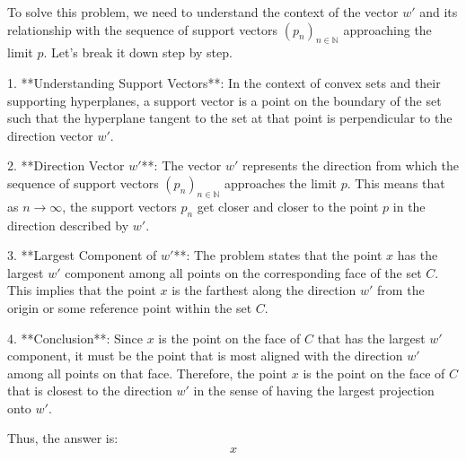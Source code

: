 To solve this problem, we need to understand the context of the vector \( w' \) and its relationship with the sequence of support vectors \( (p_n)_{n \in \mathbb{N}} \) approaching the limit \( p \). Let's break it down step by step.

1. **Understanding Support Vectors**: In the context of convex sets and their supporting hyperplanes, a support vector is a point on the boundary of the set such that the hyperplane tangent to the set at that point is perpendicular to the direction vector \( w' \).

2. **Direction Vector \( w' \)**: The vector \( w' \) represents the direction from which the sequence of support vectors \( (p_n)_{n \in \mathbb{N}} \) approaches the limit \( p \). This means that as \( n \to \infty \), the support vectors \( p_n \) get closer and closer to the point \( p \) in the direction described by \( w' \).

3. **Largest Component of \( w' \)**: The problem states that the point \( x \) has the largest \( w' \) component among all points on the corresponding face of the set \( C \). This implies that the point \( x \) is the farthest along the direction \( w' \) from the origin or some reference point within the set \( C \).

4. **Conclusion**: Since \( x \) is the point on the face of \( C \) that has the largest \( w' \) component, it must be the point that is most aligned with the direction \( w' \) among all points on that face. Therefore, the point \( x \) is the point on the face of \( C \) that is closest to the direction \( w' \) in the sense of having the largest projection onto \( w' \).

Thus, the answer is:
\[
\boxed{x}
\]